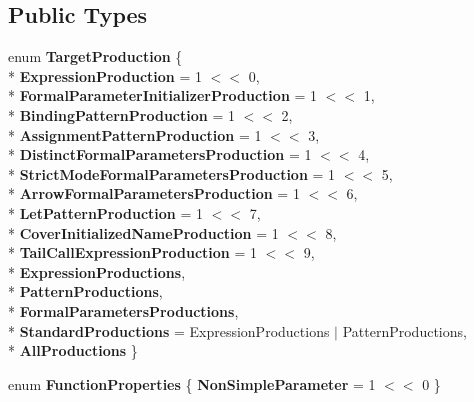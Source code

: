\subsection*{Public Types}
\begin{DoxyCompactItemize}
\item 
enum {\bfseries Target\+Production} \{ \\*
{\bfseries Expression\+Production} = 1 $<$$<$ 0, 
\\*
{\bfseries Formal\+Parameter\+Initializer\+Production} = 1 $<$$<$ 1, 
\\*
{\bfseries Binding\+Pattern\+Production} = 1 $<$$<$ 2, 
\\*
{\bfseries Assignment\+Pattern\+Production} = 1 $<$$<$ 3, 
\\*
{\bfseries Distinct\+Formal\+Parameters\+Production} = 1 $<$$<$ 4, 
\\*
{\bfseries Strict\+Mode\+Formal\+Parameters\+Production} = 1 $<$$<$ 5, 
\\*
{\bfseries Arrow\+Formal\+Parameters\+Production} = 1 $<$$<$ 6, 
\\*
{\bfseries Let\+Pattern\+Production} = 1 $<$$<$ 7, 
\\*
{\bfseries Cover\+Initialized\+Name\+Production} = 1 $<$$<$ 8, 
\\*
{\bfseries Tail\+Call\+Expression\+Production} = 1 $<$$<$ 9, 
\\*
{\bfseries Expression\+Productions}, 
\\*
{\bfseries Pattern\+Productions}, 
\\*
{\bfseries Formal\+Parameters\+Productions}, 
\\*
{\bfseries Standard\+Productions} = Expression\+Productions $\vert$ Pattern\+Productions, 
\\*
{\bfseries All\+Productions}
 \}\hypertarget{classv8_1_1internal_1_1_expression_classifier_a386dceebe524d2d4f760aa404611c56b}{}\label{classv8_1_1internal_1_1_expression_classifier_a386dceebe524d2d4f760aa404611c56b}

\item 
enum {\bfseries Function\+Properties} \{ {\bfseries Non\+Simple\+Parameter} = 1 $<$$<$ 0
 \}\hypertarget{classv8_1_1internal_1_1_expression_classifier_a01efbc543915da1d89b804694d73c678}{}\label{classv8_1_1internal_1_1_expression_classifier_a01efbc543915da1d89b804694d73c678}

\end{DoxyCompactItemize}
